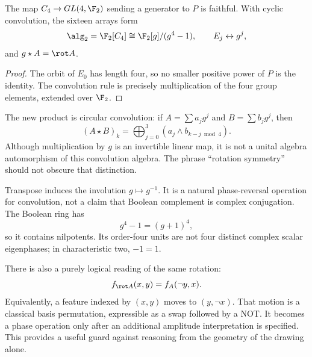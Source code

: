 \begin{proposition}
The map $C_4\to GL(4,\F_2)$ sending a generator to $P$ is faithful. With cyclic convolution, the sixteen arrays form
\begin{equation}
 \alg_2=\F_2[C_4]\cong\F_2[g]/(g^4-1),\qquad E_j\leftrightarrow g^j,
\end{equation}
and $g\star A=\rot A$.
\end{proposition}
\begin{proof}
The orbit of $E_0$ has length four, so no smaller positive power of $P$ is the identity. The convolution rule is precisely multiplication of the four group elements, extended over $\F_2$.
\end{proof}
The new product is circular convolution: if $A=\sum a_jg^j$ and $B=\sum b_jg^j$, then
\begin{equation}
 (A\star B)_k=\bigoplus_{j=0}^3(a_j\land b_{k-j\bmod4}).
\end{equation}
Although multiplication by $g$ is an invertible linear map, it is not a unital algebra automorphism of this convolution algebra. The phrase ``rotation symmetry'' should not obscure that distinction.

Transpose induces the involution $g\mapsto g^{-1}$. It is a natural phase-reversal operation for convolution, not a claim that Boolean complement is complex conjugation. The Boolean ring has
\begin{equation}\label{eq:nilpotent}
 g^4-1=(g+1)^4,
\end{equation}
so it contains nilpotents. Its order-four units are not four distinct complex scalar eigenphases; in characteristic two, $-1=1$.

There is also a purely logical reading of the same rotation:
\begin{equation}
 f_{\rot A}(x,y)=f_A(\neg y,x).
\end{equation}
Equivalently, a feature indexed by $(x,y)$ moves to $(y,\neg x)$. That motion is a classical basis permutation, expressible as a swap followed by a NOT. It becomes a phase operation only after an additional amplitude interpretation is specified. This provides a useful guard against reasoning from the geometry of the drawing alone.
